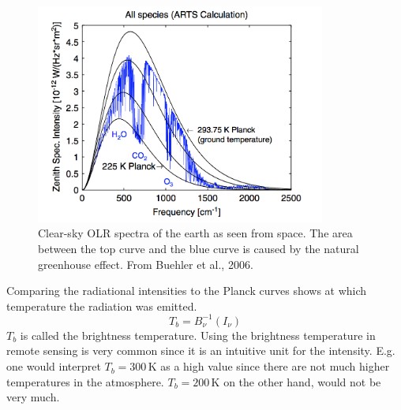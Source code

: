  \begin{figure}
\begin{center}
\includegraphics[width=0.85\textwidth]{figures/Buehler_et_al_OLR_spectra}
\caption{Clear-sky OLR spectra of the earth as seen from space. The area between the top curve and the blue curve is caused by the natural greenhouse effect. From Buehler et al., 2006.}
\label{Buehler_et_al_OLR_spectra}
\end{center}
\end{figure}

Comparing the radiational intensities to the Planck curves shows at which temperature the radiation was emitted. 
\begin{equation}
T_b = B^{-1}_{\nu}(I_{\nu})
\end{equation}
$T_b$ is called the brightness temperature. Using the brightness temperature in remote sensing is very common since it is an intuitive unit for the intensity. E.g. one would interpret $T_b = 300$\,K as a high value since there are not much higher temperatures in the atmosphere. $T_b = 200$\,K on the other hand, would not be very much.
 


